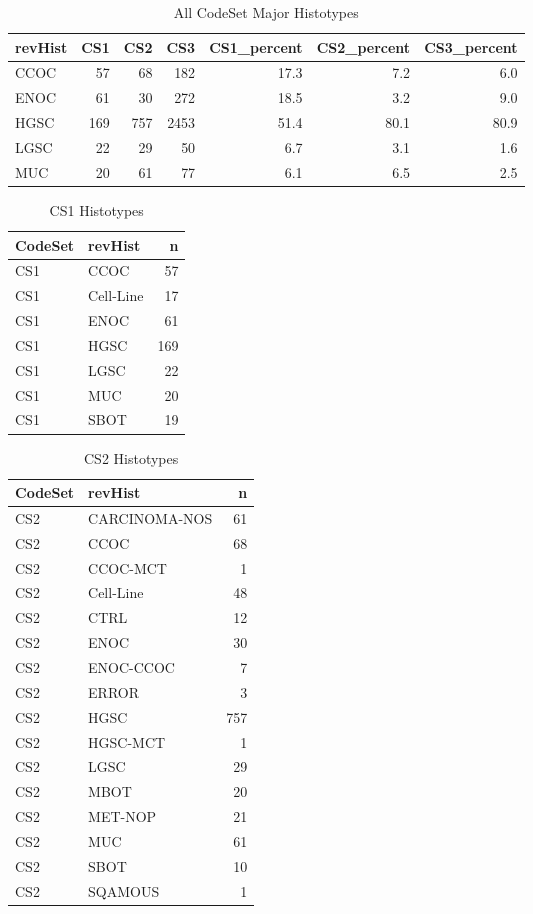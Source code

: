 \documentclass[
]{report}
\begin{document}
\begin{table}

\caption{\label{tab:dist-major-hist}All CodeSet Major Histotypes}
\centering
\begin{tabular}[t]{l|r|r|r|r|r|r}
\hline
revHist & CS1 & CS2 & CS3 & CS1\_percent & CS2\_percent & CS3\_percent\\
\hline
CCOC & 57 & 68 & 182 & 17.3 & 7.2 & 6.0\\
\hline
ENOC & 61 & 30 & 272 & 18.5 & 3.2 & 9.0\\
\hline
HGSC & 169 & 757 & 2453 & 51.4 & 80.1 & 80.9\\
\hline
LGSC & 22 & 29 & 50 & 6.7 & 3.1 & 1.6\\
\hline
MUC & 20 & 61 & 77 & 6.1 & 6.5 & 2.5\\
\hline
\end{tabular}
\end{table}

\begin{table}

\caption{\label{tab:dist-cs1}CS1 Histotypes}
\centering
\begin{tabular}[t]{l|l|r}
\hline
CodeSet & revHist & n\\
\hline
CS1 & CCOC & 57\\
\hline
CS1 & Cell-Line & 17\\
\hline
CS1 & ENOC & 61\\
\hline
CS1 & HGSC & 169\\
\hline
CS1 & LGSC & 22\\
\hline
CS1 & MUC & 20\\
\hline
CS1 & SBOT & 19\\
\hline
\end{tabular}
\end{table}

\begin{table}

\caption{\label{tab:dist-cs2}CS2 Histotypes}
\centering
\begin{tabular}[t]{l|l|r}
\hline
CodeSet & revHist & n\\
\hline
CS2 & CARCINOMA-NOS & 61\\
\hline
CS2 & CCOC & 68\\
\hline
CS2 & CCOC-MCT & 1\\
\hline
CS2 & Cell-Line & 48\\
\hline
CS2 & CTRL & 12\\
\hline
CS2 & ENOC & 30\\
\hline
CS2 & ENOC-CCOC & 7\\
\hline
CS2 & ERROR & 3\\
\hline
CS2 & HGSC & 757\\
\hline
CS2 & HGSC-MCT & 1\\
\hline
CS2 & LGSC & 29\\
\hline
CS2 & MBOT & 20\\
\hline
CS2 & MET-NOP & 21\\
\hline
CS2 & MUC & 61\\
\hline
CS2 & SBOT & 10\\
\hline
CS2 & SQAMOUS & 1\\
\hline
\end{tabular}
\end{table}
\end{document}
